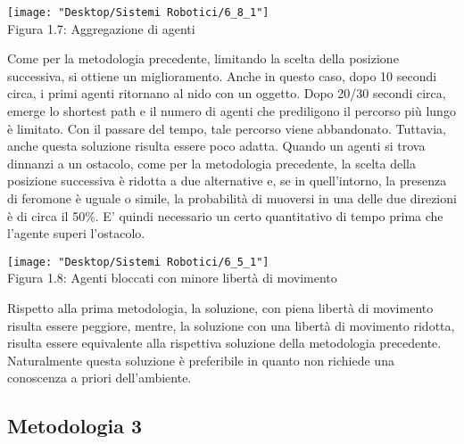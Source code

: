 \documentclass[12pt,a4paper,openright,twoside]{report}
\begin{document}
\begin{center}  
	\texttt{[image: "Desktop/Sistemi Robotici/6\_8\_1"]}
	\\Figura 1.7: Aggregazione di agenti
\end{center}

Come per la metodologia precedente, limitando la scelta della posizione successiva, si ottiene un miglioramento. Anche in questo caso, dopo 10 secondi circa, i primi agenti ritornano al nido con un oggetto. Dopo 20/30 secondi circa, emerge lo shortest path e il numero di agenti che prediligono il percorso più lungo è limitato. Con il passare del tempo, tale percorso viene abbandonato. Tuttavia, anche questa soluzione risulta essere poco adatta. Quando un agenti si trova dinnanzi a un ostacolo, come per la metodologia precedente, la scelta della posizione successiva è ridotta a due alternative e, se in quell'intorno, la presenza di feromone è uguale o simile, la probabilità di muoversi in una delle due direzioni è di circa il 50\%. E' quindi necessario un certo quantitativo di tempo prima che l'agente superi l'ostacolo.\\

\begin{center}  
	\texttt{[image: "Desktop/Sistemi Robotici/6\_5\_1"]}
	\\Figura 1.8: Agenti bloccati con minore libertà di movimento
\end{center}

Rispetto alla prima metodologia, la soluzione, con piena libertà di movimento risulta essere peggiore, mentre, la soluzione con una libertà di movimento ridotta, risulta essere equivalente alla rispettiva soluzione della metodologia precedente. Naturalmente questa soluzione è preferibile in quanto non richiede una conoscenza a priori dell'ambiente.

\subsection{Metodologia 3}
\end{document}
